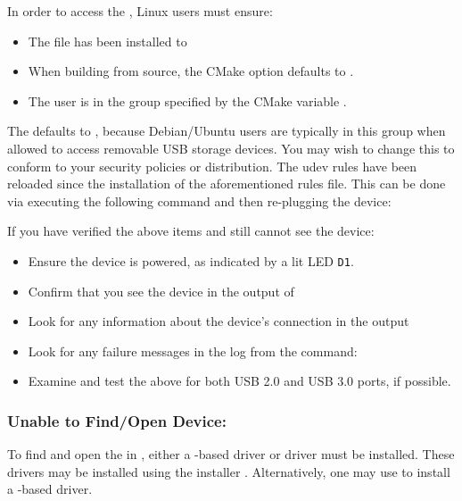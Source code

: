 In order to access the \bladerf, Linux users must ensure:
%
\begin{itemize}
    \item The  file has been installed to 
    \item When building from source, the CMake option  defaults to .
    \item The user is in the group specified by the CMake variable .
\end{itemize}


The  defaults to , because Debian/Ubuntu users are
typically in this group when allowed to access removable USB storage devices.
You may wish to change this to conform to your security policies or
distribution.  The udev rules have been reloaded since the installation of the
aforementioned rules file. This can be done via executing the following
command and then re-plugging the device:

\centerline{}

If you have verified the above items and still cannot see the device:

\begin{itemize}
    \item Ensure the device is powered, as indicated by a lit LED \texttt{D1}.
    \item Confirm that you see the device in the output of 
    \item Look for any information about the device's connection in the output
    \item Look for any failure messages in the log from the command:\\
    \item Examine and test the above for both USB 2.0 and USB 3.0 ports, if possible.
\end{itemize}

\subsubsection{Unable to Find/Open Device: \windows}\label{sec:open-windows}

To find and open the \bladerf in \windows, either a \libusb-based
driver or \cypress \cyusb driver must be installed. These drivers
may be installed using the \bladerf \windows installer
\cite{BLADERF_WINDOWS_INSTALL_GUIDE}. Alternatively, one may use \zadig
\cite{ZADIG} to install a \libusb-based driver.

